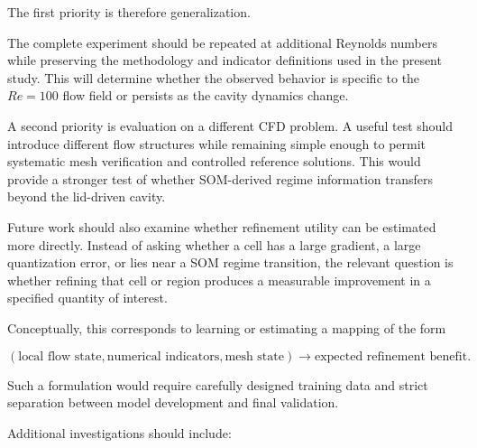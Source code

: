 The first priority is therefore generalization.

The complete experiment should be repeated at additional Reynolds
numbers while preserving the methodology and indicator definitions used
in the present study. This will determine whether the observed behavior
is specific to the \(Re=100\) flow field or persists as the cavity
dynamics change.

A second priority is evaluation on a different CFD problem. A useful
test should introduce different flow structures while remaining simple
enough to permit systematic mesh verification and controlled reference
solutions. This would provide a stronger test of whether SOM-derived
regime information transfers beyond the lid-driven cavity.

Future work should also examine whether refinement utility can be
estimated more directly. Instead of asking whether a cell has a large
gradient, a large quantization error, or lies near a SOM regime
transition, the relevant question is whether refining that cell or
region produces a measurable improvement in a specified quantity of
interest.

Conceptually, this corresponds to learning or estimating a mapping of
the form

\begin{equation}
\left(
\text{local flow state},
\text{numerical indicators},
\text{mesh state}
\right)
\longrightarrow
\text{expected refinement benefit}.
\end{equation}

Such a formulation would require carefully designed training data and
strict separation between model development and final validation.

Additional investigations should include:

